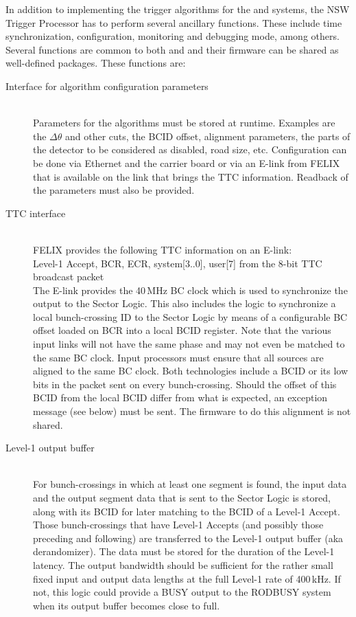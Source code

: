 In addition to implementing the trigger algorithms for the \MM and
\stgc systems, the NSW Trigger Processor has to perform several
ancillary functions. These include time synchronization,
configuration, monitoring and debugging mode, among others. Several functions are common to both \MM and \stgc and their firmware can be shared as well-defined packages. These functions are:

\begin{description}

  \item[Interface for algorithm configuration parameters] \hfill \\
  Parameters for the algorithms must be stored at runtime. Examples
  are the $\Delta\theta$ and other cuts, the BCID offset, alignment
  parameters, the parts of the detector to be considered as disabled,
  road size, etc. Configuration can be done via Ethernet and the
  carrier board or via an E-link from FELIX that is available on the link that brings the TTC information.
  Readback of the parameters must also be provided.

  \item[TTC interface] \hfill \\
  FELIX provides the following TTC information on an E-link: \\
  \hspace*{5mm} Level-1 Accept, BCR, ECR, system[3..0], user[7] from the 8-bit TTC broadcast packet \\
  The E-link provides the 40\,MHz BC clock which is used to
  synchronize the output to the Sector Logic. This also includes the logic to synchronize a local bunch-crossing ID to the Sector Logic
  by means of a configurable BC offset loaded on BCR into a local BCID register.
  Note that the various input links will not have the same phase and may not even be matched to the same BC clock.
  Input processors must ensure that all sources are aligned to the same BC clock.
  Both technologies include a BCID or its low bits in the packet sent on every bunch-crossing.
  Should the offset of this BCID from the local BCID differ from what is expected, an exception message (see below) must be sent.
  The firmware to do this alignment is not shared.

  \item[Level-1 output buffer] \hfill \\
  For bunch-crossings in which at least one segment is found,
  the input data and the output segment data that is sent to the Sector Logic is stored,
  along with its BCID for later matching to the BCID of a Level-1 Accept.
  Those bunch-crossings that have Level-1 Accepts (and possibly those preceding and following) are transferred to the Level-1 output buffer (aka derandomizer).
  The data must be stored for the duration of the Level-1 latency.
  The output bandwidth should be sufficient for the rather small fixed input and output data lengths at the full Level-1 rate of 400\,kHz.
  If not, this logic could provide a BUSY output to the RODBUSY system when its output buffer becomes close to full.


\end{description}
